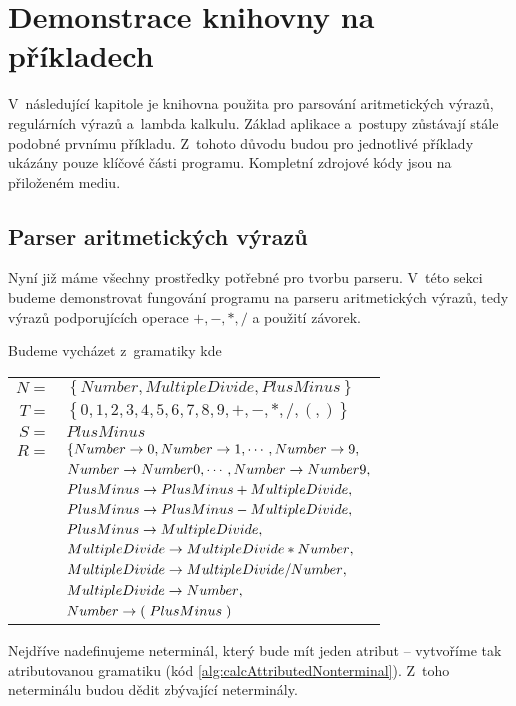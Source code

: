 \chapter{Demonstrace knihovny na příkladech}

	V~následující kapitole je knihovna použita pro parsování aritmetických výrazů, regulárních výrazů a~lambda kalkulu. Základ aplikace a~postupy zůstávají stále podobné prvnímu příkladu. Z~tohoto důvodu budou pro jednotlivé příklady ukázány pouze klíčové části programu. Kompletní zdrojové kódy jsou na přiloženém mediu.
	
	\section{Parser aritmetických výrazů}
	
		Nyní již máme všechny prostředky potřebné pro tvorbu parseru. V~této sekci budeme demonstrovat fungování programu na parseru aritmetických výrazů, tedy výrazů podporujících operace $+,-,*,/$ a použití závorek.
		
		Budeme vycházet z~gramatiky \GrammarDef\space kde
		
		\begin{tabular}{rl}
			$N=$ & $\left\{ Number, MultipleDivide, PlusMinus \right\}$\\
			$T=$ & $\left\{0,1,2,3,4,5,6,7,8,9,+,-,*,/,\left(,\right)\right\}$\\
			$S=$ & $PlusMinus$\\
			$R=$ & $\left\{ {Number} \allowbreak\rightarrow\allowbreak {0},{Number} \allowbreak\rightarrow\allowbreak {1},\cdots,{Number} \allowbreak\rightarrow\allowbreak {9}, \right.$ \\
			& ${Number} \allowbreak\rightarrow\allowbreak {Number 0},\cdots,{Number} \allowbreak\rightarrow\allowbreak {Number 9},$ \\
			& ${PlusMinus} \allowbreak\rightarrow\allowbreak {PlusMinus + MultipleDivide},$ \\
			& ${PlusMinus} \allowbreak\rightarrow\allowbreak {PlusMinus - MultipleDivide},$ \\
			& ${PlusMinus} \allowbreak\rightarrow\allowbreak {MultipleDivide},$ \\
			& ${MultipleDivide} \allowbreak\rightarrow\allowbreak {MultipleDivide * Number},$ \\
			& ${MultipleDivide} \allowbreak\rightarrow\allowbreak {MultipleDivide / Number},$ \\
			& ${MultipleDivide} \allowbreak\rightarrow\allowbreak {Number},$ \\
			& ${Number} \allowbreak\rightarrow\allowbreak {\left(\right. PlusMinus \left.\right)}$ \\
		\end{tabular}
		
		Nejdříve nadefinujeme neterminál, který bude mít jeden atribut -- vytvoříme tak atributovanou gramatiku (kód \ref{alg:calcAttributedNonterminal}). Z~toho neterminálu budou dědit zbývající neterminály.
		
